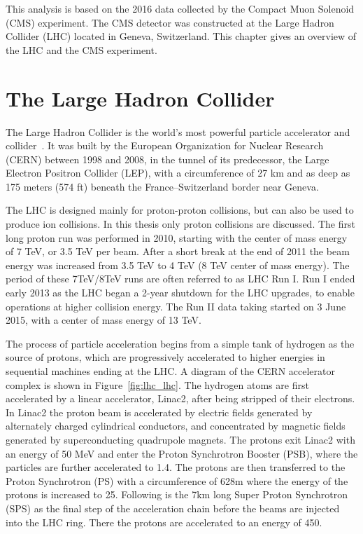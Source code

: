
This analysis is based on the 2016 data collected by the Compact Muon Solenoid (CMS) experiment. The CMS detector was constructed at the Large Hadron Collider (LHC) located in Geneva, Switzerland. This chapter gives an overview of the LHC and the CMS experiment.

\section{The Large Hadron Collider} 
The Large Hadron Collider is the world's most powerful particle accelerator and collider~\cite{lhc_lhcmachine,lhc_lhcreport}. It was built by the European Organization for Nuclear Research (CERN) between 1998 and 2008, in the tunnel of its predecessor, the Large Electron Positron Collider (LEP), with a circumference of 27 km and as deep as 175 meters (574 ft) beneath the France–Switzerland border near Geneva. 

\vspace{0.3cm}
The LHC is designed mainly for proton-proton collisions, but can also be used to produce ion collisions. In this thesis only proton collisions are discussed. The first long proton run was performed in 2010, starting with the center of mass energy of 7 TeV, or 3.5 TeV per beam. After a short break at the end of 2011 the beam energy was increased from 3.5 TeV to 4 TeV (8 TeV center of mass energy). The period of these 7TeV/8TeV runs are often referred to as LHC Run I. Run I ended early 2013 as the LHC began a 2-year shutdown for the LHC upgrades, to enable operations at higher collision energy. The Run II data taking started on 3 June 2015, with a center of mass energy of 13 TeV. 

\vspace{0.3cm}
The process of particle acceleration begins from a simple tank of hydrogen as the source of protons, which are progressively accelerated to higher energies in sequential machines ending at the LHC. A diagram of the CERN accelerator complex is shown in Figure~\ref{fig:lhc_lhc}. The hydrogen atoms are first accelerated by a linear accelerator, Linac2, after being stripped of their electrons. In Linac2 the proton beam is accelerated by electric fields generated by alternately charged cylindrical conductors, and concentrated by magnetic fields generated by superconducting quadrupole magnets. The protons exit Linac2 with an energy of 50 MeV and enter the Proton Synchrotron Booster (PSB), where the particles are further accelerated to 1.4\GeV. The protons are then transferred to the Proton Synchrotron (PS) with a circumference of 628m where the energy of the protons is increased to 25\GeV. Following is the 7km long Super Proton Synchrotron (SPS) as the final step of the acceleration chain before the beams are injected into the LHC ring. There the protons are accelerated to an energy of 450\GeV.

